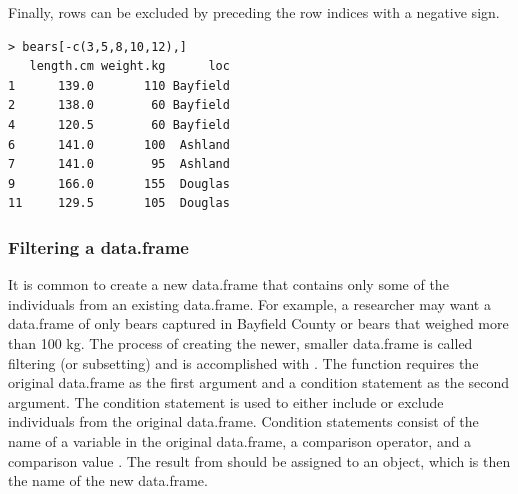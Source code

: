 \documentclass[10pt,openany]{book}\usepackage[]{graphicx}\usepackage[]{color}
\makeatletter
\newenvironment{kframe}{%
 \def\at@end@of@kframe{}%
 \ifinner\ifhmode%
  \def\at@end@of@kframe{\end{minipage}}%
  \begin{minipage}{\columnwidth}%
 \fi\fi%
 \def\FrameCommand##1{\hskip\@totalleftmargin \hskip-\fboxsep
 \colorbox{shadecolor}{##1}\hskip-\fboxsep
     \hskip-\linewidth \hskip-\@totalleftmargin \hskip\columnwidth}%
 \MakeFramed {\advance\hsize-\width
   \@totalleftmargin\z@ \linewidth\hsize
   \@setminipage}}%
 {\par\unskip\endMakeFramed%
 \at@end@of@kframe}
\newenvironment{knitrout}{}{} %
\makeatother
\begin{document}
Finally, rows can be excluded by preceding the row indices with a negative sign.
\begin{knitrout}
\color{fgcolor}\begin{kframe}
\begin{verbatim}
> bears[-c(3,5,8,10,12),]
   length.cm weight.kg      loc
1      139.0       110 Bayfield
2      138.0        60 Bayfield
4      120.5        60 Bayfield
6      141.0       100  Ashland
7      141.0        95  Ashland
9      166.0       155  Douglas
11     129.5       105  Douglas
\end{verbatim}
\end{kframe}
\end{knitrout}


\subsubsection{Filtering a data.frame}  \label{sect:RSubsetdf}
It is common to create a new data.frame that contains only some of the individuals from an existing data.frame.  For example, a researcher may want a data.frame of only bears captured in Bayfield County or bears that weighed more than 100 kg.  The process of creating the newer, smaller data.frame is called filtering (or subsetting) and is accomplished with .  The  function requires the original data.frame as the first argument and a condition statement as the second argument.  The condition statement is used to either include or exclude individuals from the original data.frame.  Condition statements consist of the name of a variable in the original data.frame, a comparison operator, and a comparison value .  The result from  should be assigned to an object, which is then the name of the new data.frame.

\end{document}

